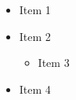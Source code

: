 \documentclass[9pt,aspectratio=169]{beamer}
\begin{document}
\begin{frame}

\begin{itemize}
    \item<1-|red@3-> Item 1
    \item Item 2
    \begin{itemize}
        \item<2-|red@3-> Item 3
    \end{itemize}
    \item Item 4
\end{itemize}

\end{frame}
\end{document}

